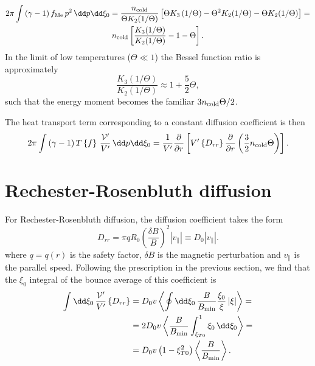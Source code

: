 \documentclass{notes}
\newcommand{\fMe}{f_{\rm Me}}
\newcommand{\ncold}{n_{\rm cold}}
\newcommand{\Vp}{\mathcal{V}'}
\newcommand{\VpVol}{V'}
\begin{document}
    \begin{equation}
        \begin{gathered}
            2\pi\int\left( \gamma-1 \right)\fMe\,p^2\,\dd p\dd\xi_0 =
            \frac{\ncold}{\Theta K_2(1/\Theta)} \left[
                \Theta K_3\left(1/\Theta\right) - \Theta^2 K_2(1/\Theta) - \Theta K_2(1/\Theta)
            \right] =\\
            \ncold\left[ \frac{K_3(1/\Theta)}{K_2(1/\Theta)} - 1 - \Theta \right].
        \end{gathered}
    \end{equation}
    In the limit of low temperatures ($\Theta\ll 1$) the Bessel function ratio
    is approximately
    \begin{equation}
        \frac{K_3(1/\Theta)}{K_2(1/\Theta)}\approx 1 + \frac{5}{2}\Theta,
    \end{equation}
    such that the energy moment becomes the familiar $3\ncold\Theta/2$.

    The heat transport term corresponding to a constant diffusion coefficient
    is then
    \begin{equation}
        2\pi\int\left(\gamma-1\right) T\left\{f\right\}\,\frac{\Vp}{\VpVol}\,\dd p\dd\xi_0 =
        \frac{1}{\VpVol}\frac{\partial}{\partial r}\left[
            \VpVol\left\{ D_{rr} \right\}\frac{\partial}{\partial r} \left( \frac{3}{2}\ncold\Theta \right)
        \right].
    \end{equation}

    \section{Rechester-Rosenbluth diffusion}
    For Rechester-Rosenbluth diffusion, the diffusion coefficient takes the form
    \begin{equation}
        D_{rr} = \pi qR_0\left( \frac{\delta B}{B} \right)^2 \left| v_\parallel \right|\equiv
        D_0 \left| v_\parallel \right|.
    \end{equation}
    where $q=q(r)$ is the safety factor, $\delta B$ is the magnetic perturbation
    and $v_\parallel$ is the parallel speed. Following the prescription in the
    previous section, we find that the $\xi_0$ integral of the bounce average of
    this coefficient is
    \begin{equation}
        \begin{aligned}
            \int\dd\xi_0\,\frac{\Vp}{\VpVol}\left\{ D_{rr} \right\} &=
            D_0v\left\langle\oint\dd\xi_0\,\frac{B}{B_{\rm min}}\frac{\xi_0}{\xi}\left|\xi\right|\right\rangle =\\
            &= 2D_0v\left\langle \frac{B}{B_{\rm min}}\int_{\xi_{T0}}^1\xi_0\,\dd\xi_0\right\rangle =\\
            &= D_0v\left( 1 - \xi_{T0}^2 \right)\left\langle \frac{B}{B_{\rm min}} \right\rangle.
        \end{aligned}
    \end{equation}
\end{document}
